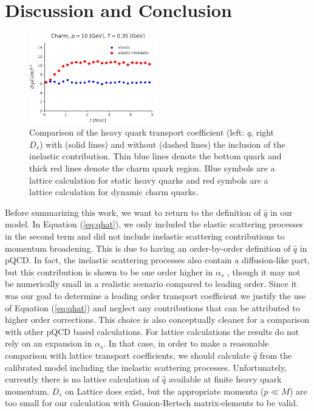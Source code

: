 \documentclass[aps, prc, reprint, amsmath, groupedaddress, nofootinbib]{revtex4-1}
\begin{document}
\section{Discussion and Conclusion}\label{section:conclusion}
\begin{figure}
\includegraphics[width=0.5\textwidth]{qhat_full.pdf}
\caption{Comparison of the heavy quark transport coefficient (left: $\hat{q}$, right $D_s$) with (solid lines) and without (dashed lines) the inclusion of the inelastic contribution. Thin blue lines denote the bottom quark and thick red lines denote the charm quark region. Blue symbols are a lattice calculation for static heavy quarks and red symbols  are a lattice calculation for dynamic charm quarks.}\label{plots:transport_full}
\end{figure}
Before summarizing this work, we want to return to the definition of $\hat{q}$ in our model.
In Equation (\ref{eq:qhat}), we  only included the elastic scattering processes in the second term and did not include inelastic scattering contributions to momentum broadening.
This is due to having an order-by-order definition of $\hat{q}$ in pQCD.
In fact, the inelastic scattering processes also contain a diffusion-like part, but this contribution is shown to be one order higher in $\alpha_s$ \cite{Ghiglieri:2015ala}, though it may not be numerically small in a realistic scenario compared to leading order.
Since it was our goal to determine a leading order transport coefficient we justify the use of Equation (\ref{eq:qhat}) and neglect any contributions that can be attributed to higher order corrections. 
This choice is also conceptually cleaner for a comparison with other pQCD based calculations.
For lattice calculations the results do not rely on an expansion in $\alpha_s$.
In that case, in order to make a reasonable comparison with lattice transport coefficients, we should calculate $\hat{q}$ from the calibrated model including the inelastic scattering processes.
Unfortunately, currently there is no lattice calculation of $\hat{q}$ available at finite heavy quark momentum.  
$D_s$ on Lattice does exist, but the appropriate momenta ($p \ll M$) are too small for our calculation with Gunion-Bertsch matrix-elements to be valid.
\end{document}
